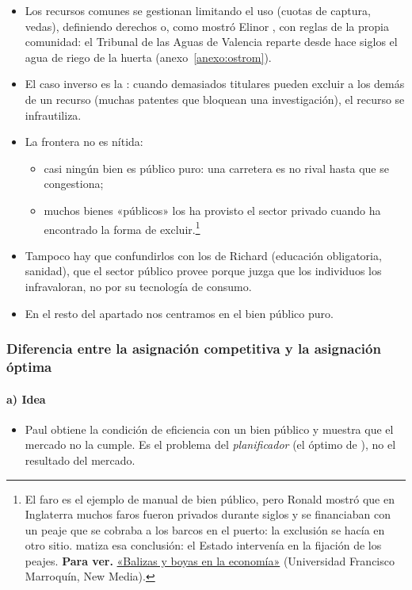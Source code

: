 \documentclass[11pt]{article}
\begin{document}
\begin{itemize}
\item Los recursos comunes se gestionan limitando el uso (cuotas de captura, vedas), definiendo derechos o, como mostró Elinor \textcite{Ostrom1990Governing}, con reglas de la propia comunidad: el Tribunal de las Aguas de Valencia reparte desde hace siglos el agua de riego de la huerta (anexo~\ref{anexo:ostrom}).
\item El caso inverso es la \nocite{Heller1998Tragedy}: cuando demasiados titulares pueden excluir a los demás de un recurso (muchas patentes que bloquean una investigación\nocite{HellerEisenberg1998Patents}), el recurso se infrautiliza.
\item La frontera no es nítida:
  \begin{itemize}
  \item casi ningún bien es público puro: una carretera es no rival hasta que se congestiona;
  \item muchos bienes «públicos» los ha provisto el sector privado cuando ha encontrado la forma de excluir.\footnote{El faro es el ejemplo de manual de bien público, pero Ronald \textcite{Coase1974Lighthouse} mostró que en Inglaterra muchos faros fueron privados durante siglos y se financiaban con un peaje que se cobraba a los barcos en el puerto: la exclusión se hacía en otro sitio. \textcite{Bertrand2006Coasean} matiza esa conclusión: el Estado intervenía en la fijación de los peajes. \textbf{Para ver.} \href{https://newmedia.ufm.edu/video/balizas-y-boyas-en-la-economia/}{«Balizas y boyas en la economía»} (Universidad Francisco Marroquín, New Media).}
  \end{itemize}
\item Tampoco hay que confundirlos con los  de Richard \textcite{Musgrave1959Theory} (educación obligatoria, sanidad), que el sector público provee porque juzga que los individuos los infravaloran, no por su tecnología de consumo.
\item En el resto del apartado nos centramos en el bien público puro.
\end{itemize}

\subsubsection{Diferencia entre la asignación competitiva y la asignación óptima}\label{sec:bienes-publicos-asignacion}

\paragraph{a) Idea}
\begin{itemize}
\item Paul \textcite{Samuelson1954Pure} obtiene la condición de eficiencia con un bien público y muestra que el mercado no la cumple. Es el problema del \emph{planificador} (el óptimo de ), no el resultado del mercado.
\end{itemize}
\end{document}
